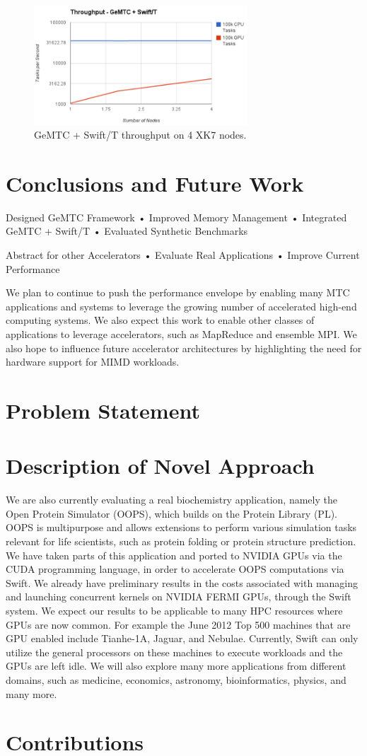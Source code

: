\documentclass[conference]{IEEEtran}
\begin{document}
\begin{figure}[h]
\centering\includegraphics[width=8cm]{imgs/throughput4nodes.png}
\caption{GeMTC + Swift/T throughput on 4 XK7 nodes.}
\label{fig:throughput}
\end{figure}

\section{Conclusions and Future Work}
Designed GeMTC Framework
• Improved Memory Management
• Integrated GeMTC + Swift/T
• Evaluated Synthetic Benchmarks

Abstract for other Accelerators
• Evaluate Real Applications
• Improve Current Performance

We plan to continue to push the performance envelope by enabling many MTC applications and systems to leverage the growing number of accelerated high-end computing systems. We also expect this work to enable other classes of applications to leverage accelerators, such as MapReduce and ensemble MPI. We also hope to influence future accelerator architectures by highlighting the need for hardware support for MIMD workloads.

\section{Problem Statement}

\section{Description of Novel Approach}


We are also currently evaluating a real biochemistry application, namely the Open Protein Simulator (OOPS), which builds on the Protein Library (PL). OOPS is multipurpose and allows extensions to perform various simulation tasks relevant for life scientists, such as protein folding or protein structure prediction.\cite{OOPS} We have taken parts of this application and ported to NVIDIA GPUs via the CUDA programming language, in order to accelerate OOPS computations via Swift. We already have preliminary results in the costs associated with managing and launching concurrent kernels on NVIDIA FERMI GPUs, through the Swift system. We expect our results to be applicable to many HPC resources where GPUs are now common. For example the June 2012 Top 500 machines that are GPU enabled include Tianhe-1A, Jaguar, and Nebulae. Currently, Swift can only utilize the general processors on these machines to execute workloads and the GPUs are left idle. We will also explore many more applications from different domains, such as medicine, economics, astronomy, bioinformatics, physics, and many more.
\section{Contributions}




\end{document}
